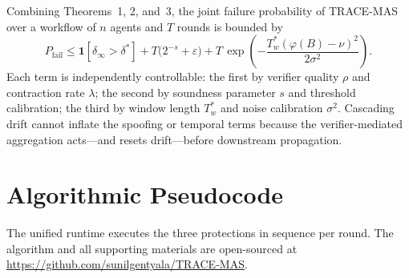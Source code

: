\documentclass[conference]{IEEEtran}
\begin{document}
Combining Theorems~1, 2, and~3, the joint failure probability of
\textsc{TRACE-MAS} over a workflow of $n$ agents and $T$ rounds is
bounded by
\begin{equation}
P_{\mathrm{fail}} \leq
\mathbf{1}[\delta_\infty > \delta^{*}]
+ T\bigl(2^{-s} + \varepsilon\bigr)
+ T\,\exp\!\left(-\frac{T_w^{*}(\varphi(B) - \nu)^2}{2\sigma^2}
\right).
\end{equation}
Each term is independently controllable: the first by verifier quality
$\rho$ and contraction rate $\lambda$; the second by soundness
parameter $s$ and threshold calibration; the third by window length
$T_w^{*}$ and noise calibration $\sigma^2$. Cascading drift cannot
inflate the spoofing or temporal terms because the verifier-mediated
aggregation acts---and resets drift---before downstream propagation.

\section{Algorithmic Pseudocode}
\label{sec:algo}

The unified runtime executes the three protections in sequence per
round. The algorithm and all supporting materials are open-sourced at
\url{https://github.com/sunilgentyala/TRACE-MAS}.
\end{document}
